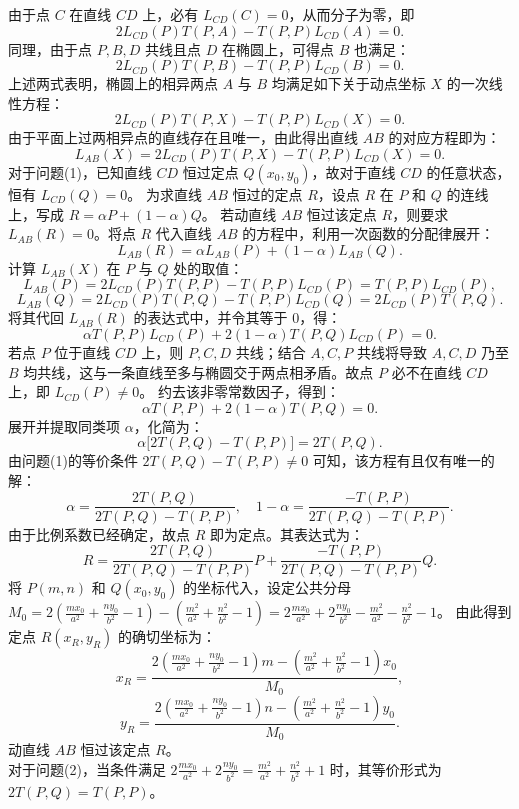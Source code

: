 \begin{solution}
由于点 $C$ 在直线 $CD$ 上，必有 $L_{CD}(C) = 0$，从而分子为零，即
\[ 2L_{CD}(P)T(P, A) - T(P, P)L_{CD}(A) = 0. \]
同理，由于点 $P, B, D$ 共线且点 $D$ 在椭圆上，可得点 $B$ 也满足：
\[ 2L_{CD}(P)T(P, B) - T(P, P)L_{CD}(B) = 0. \]
上述两式表明，椭圆上的相异两点 $A$ 与 $B$ 均满足如下关于动点坐标 $X$ 的一次线性方程：
\[ 2L_{CD}(P)T(P, X) - T(P, P)L_{CD}(X) = 0. \]
由于平面上过两相异点的直线存在且唯一，由此得出直线 $AB$ 的对应方程即为：
\[ L_{AB}(X) = 2L_{CD}(P)T(P, X) - T(P, P)L_{CD}(X) = 0. \]
对于问题(1)，已知直线 $CD$ 恒过定点 $Q(x_0, y_0)$，故对于直线 $CD$ 的任意状态，恒有 $L_{CD}(Q) = 0$。
为求直线 $AB$ 恒过的定点 $R$，设点 $R$ 在 $P$ 和 $Q$ 的连线上，写成 $R = \alpha P + (1-\alpha)Q$。
若动直线 $AB$ 恒过该定点 $R$，则要求 $L_{AB}(R) = 0$。将点 $R$ 代入直线 $AB$ 的方程中，利用一次函数的分配律展开：
\[ L_{AB}(R) = \alpha L_{AB}(P) + (1-\alpha)L_{AB}(Q). \]
计算 $L_{AB}(X)$ 在 $P$ 与 $Q$ 处的取值：
\[ L_{AB}(P) = 2L_{CD}(P)T(P, P) - T(P, P)L_{CD}(P) = T(P, P)L_{CD}(P), \]
\[ L_{AB}(Q) = 2L_{CD}(P)T(P, Q) - T(P, P)L_{CD}(Q) = 2L_{CD}(P)T(P, Q). \]
将其代回 $L_{AB}(R)$ 的表达式中，并令其等于 $0$，得：
\[ \alpha T(P, P)L_{CD}(P) + 2(1-\alpha)T(P, Q)L_{CD}(P) = 0. \]
若点 $P$ 位于直线 $CD$ 上，则 $P, C, D$ 共线；结合 $A, C, P$ 共线将导致 $A, C, D$ 乃至 $B$ 均共线，这与一条直线至多与椭圆交于两点相矛盾。故点 $P$ 必不在直线 $CD$ 上，即 $L_{CD}(P) \neq 0$。
约去该非零常数因子，得到：
\[ \alpha T(P, P) + 2(1-\alpha)T(P, Q) = 0. \]
展开并提取同类项 $\alpha$，化简为：
\[ \alpha \big[2T(P, Q) - T(P, P)\big] = 2T(P, Q). \]
由问题(1)的等价条件 $2T(P, Q) - T(P, P) \neq 0$ 可知，该方程有且仅有唯一的解：
\[ \alpha = \frac{2T(P, Q)}{2T(P, Q) - T(P, P)}, \quad 1-\alpha = \frac{-T(P, P)}{2T(P, Q) - T(P, P)}. \]
由于比例系数已经确定，故点 $R$ 即为定点。其表达式为：
\[ R = \frac{2T(P, Q)}{2T(P, Q) - T(P, P)} P + \frac{-T(P, P)}{2T(P, Q) - T(P, P)} Q. \]
将 $P(m,n)$ 和 $Q(x_0,y_0)$ 的坐标代入，设定公共分母 $M_0 = 2\left(\frac{mx_0}{a^2} + \frac{ny_0}{b^2} - 1\right) - \left(\frac{m^2}{a^2} + \frac{n^2}{b^2} - 1\right) = 2\frac{mx_0}{a^2} + 2\frac{ny_0}{b^2} - \frac{m^2}{a^2} - \frac{n^2}{b^2} - 1$。
由此得到定点 $R(x_R, y_R)$ 的确切坐标为：
\[ x_R = \frac{2\left(\frac{mx_0}{a^2} + \frac{ny_0}{b^2} - 1\right)m - \left(\frac{m^2}{a^2} + \frac{n^2}{b^2} - 1\right)x_0}{M_0}, \]
\[ y_R = \frac{2\left(\frac{mx_0}{a^2} + \frac{ny_0}{b^2} - 1\right)n - \left(\frac{m^2}{a^2} + \frac{n^2}{b^2} - 1\right)y_0}{M_0}. \]
动直线 $AB$ 恒过该定点 $R$。\\
对于问题(2)，当条件满足 $2\frac{mx_0}{a^2} + 2\frac{ny_0}{b^2} = \frac{m^2}{a^2} + \frac{n^2}{b^2} + 1$ 时，其等价形式为 $2T(P, Q) = T(P, P)$。

\end{solution}
